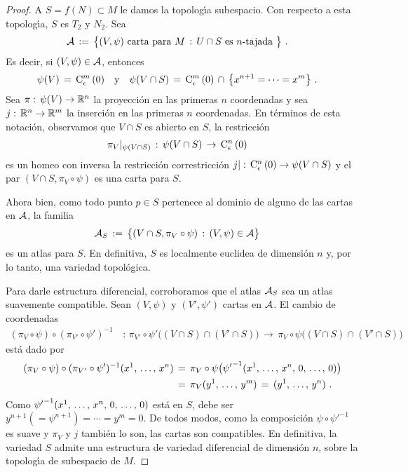 \begin{proof}
	A $S=f(N)\subset M$ le damos la topolog\'{\i}a subespacio. Con respecto
	a esta topolog\'{\i}a, $S$ es $T_2$ y $N_2$. Sea
	\begin{align*}
		\cal A & \,:=\,\big\{(V,\psi)\text{ carta para } M\,:\,
			U\cap S\text{ es } n\text{-tajada }\big\}
		\text{ .}
	\end{align*}
	Es decir, si $(V,\psi)\in\cal A$, entonces
	\begin{align*}
		\psi(V)\,=\,\cubo[m]{\epsilon}{0} & \quad\text{y}\quad
			\psi(V\cap S) \,=\,\cubo[m]{\epsilon}{0}\,\cap\,
				\big\{x^{n+1}=\cdots=x^m\big\}
		\text{ .}
	\end{align*}
	Sea $\pi:\,\psi(V)\rightarrow\bb R^n$ la proyecci\'{o}n en las
	primeras $n$ coordenadas y sea $j:\,\bb R^n\rightarrow\bb R^m$ la
	inserci\'{o}n en las primeras $n$ coordenadas. En t\'{e}rminos de esta
	notaci\'{o}n, observamos que $V\cap S$ es abierto en $S$, la
	restricci\'{o}n
	\begin{align*}
		\pi_V|_{\psi(V\cap S)} & \,:\,\psi(V\cap S)\,\rightarrow\,
			\cubo[n]{\epsilon}{0}
	\end{align*}
	es un homeo con inversa la restricci\'{o}n correstricci\'{o}n
	\begin{math}
		j|:\,\cubo[n]{\epsilon}{0}\rightarrow\psi(V\cap S)
	\end{math} y el par $(V\cap S,\pi_V\circ\psi)$ es una carta para $S$.

	Ahora bien, como todo punto $p\in S$ pertenece al dominio de alguno de
	las cartas en $\cal A$, la familia
	\begin{align*}
		\cal A_S & \,:=\,\big\{(V\cap S,\pi_V\circ\psi)\,:\,
			(V,\psi)\in\cal A\big\}
	\end{align*}
	es un atlas para $S$. En definitiva, $S$ es localmente euclidea de
	dimensi\'{o}n $n$ y, por lo tanto, una variedad topol\'{o}gica.

	Para darle estructura diferencial, corroboramos que el atlas $\cal A_S$
	sea un atlas suavemente compatible. Sean $(V,\psi)$ y $(V',\psi')$
	cartas en $\cal A$. El cambio de coordenadas
	\begin{align*}
		(\pi_V\circ\psi)\circ(\pi_{V'}\circ\psi')^{-1} & \,:\,
		\pi_{V'}\circ\psi'\big((V\cap S)\cap(V'\cap S)\big)
			\,\rightarrow\,
		\pi_V\circ\psi\big((V\cap S)\cap(V'\cap S)\big)
	\end{align*}
	est\'{a} dado por
	\begin{align*}
		(\pi_V\circ\psi)\circ(\pi_{V'}\circ\psi')^{-1}
			(\lista*{x}{n}) & \,=\,
			\pi_V\circ\psi\big(
				{\psi'}^{-1}(\lista*{x}{n},\,0,\,\dots,\,0)
				\big) \\
		& \,=\,\pi_V(\lista*{y}{m}) \,=\,(\lista*{y}{n})
		\text{ .}
	\end{align*}
	Como ${\psi'}^{-1}(\lista*{x}{n},\,0,\,\dots,\,0)$ est\'{a} en $S$,
	debe ser $y^{n+1}(=\psi^{n+1})=\cdots=y^m=0$. De todos modos, como la
	composici\'{o}n $\psi\circ{\psi'}^{-1}$ es suave y $\pi_V$ y $j$
	tambi\'{e}n lo son, las cartas son compatibles. En definitiva, la
	variedad $S$ admite una estructura de variedad diferencial de
	dimensi\'{o}n $n$, sobre la topolog\'{\i}a de subespacio de $M$.


\end{proof}
